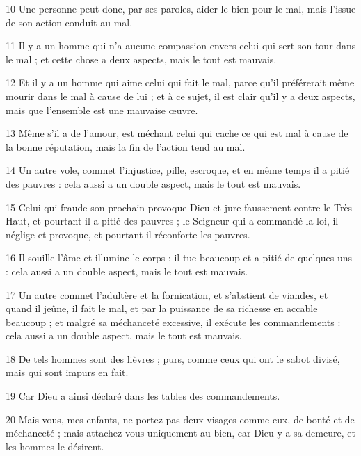 \par 10 Une personne peut donc, par ses paroles, aider le bien pour le mal, mais l'issue de son action conduit au mal.

\par 11 Il y a un homme qui n'a aucune compassion envers celui qui sert son tour dans le mal ; et cette chose a deux aspects, mais le tout est mauvais.

\par 12 Et il y a un homme qui aime celui qui fait le mal, parce qu'il préférerait même mourir dans le mal à cause de lui ; et à ce sujet, il est clair qu’il y a deux aspects, mais que l’ensemble est une mauvaise œuvre.

\par 13 Même s'il a de l'amour, est méchant celui qui cache ce qui est mal à cause de la bonne réputation, mais la fin de l'action tend au mal.

\par 14 Un autre vole, commet l'injustice, pille, escroque, et en même temps il a pitié des pauvres : cela aussi a un double aspect, mais le tout est mauvais.

\par 15 Celui qui fraude son prochain provoque Dieu et jure faussement contre le Très-Haut, et pourtant il a pitié des pauvres ; le Seigneur qui a commandé la loi, il néglige et provoque, et pourtant il réconforte les pauvres.

\par 16 Il souille l'âme et illumine le corps ; il tue beaucoup et a pitié de quelques-uns : cela aussi a un double aspect, mais le tout est mauvais.

\par 17 Un autre commet l'adultère et la fornication, et s'abstient de viandes, et quand il jeûne, il fait le mal, et par la puissance de sa richesse en accable beaucoup ; et malgré sa méchanceté excessive, il exécute les commandements : cela aussi a un double aspect, mais le tout est mauvais.

\par 18 De tels hommes sont des lièvres ; purs, comme ceux qui ont le sabot divisé, mais qui sont impurs en fait.

\par 19 Car Dieu a ainsi déclaré dans les tables des commandements.

\par 20 Mais vous, mes enfants, ne portez pas deux visages comme eux, de bonté et de méchanceté ; mais attachez-vous uniquement au bien, car Dieu y a sa demeure, et les hommes le désirent.

